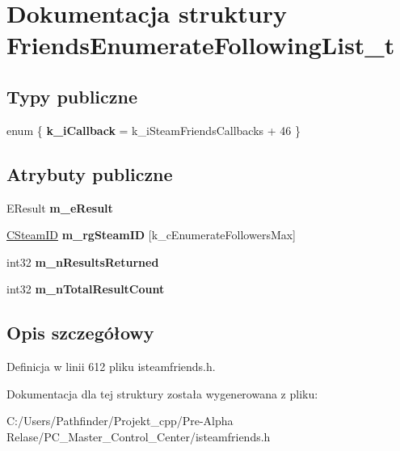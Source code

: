\hypertarget{struct_friends_enumerate_following_list__t}{}\section{Dokumentacja struktury Friends\+Enumerate\+Following\+List\+\_\+t}
\label{struct_friends_enumerate_following_list__t}
\subsection*{Typy publiczne}
\begin{DoxyCompactItemize}
\item 
\mbox{\label{struct_friends_enumerate_following_list__t_aa8e8ebd960263b29a7f01c3632163212}} 
enum \{ {\bfseries k\+\_\+i\+Callback} = k\+\_\+i\+Steam\+Friends\+Callbacks + 46
 \}
\end{DoxyCompactItemize}
\subsection*{Atrybuty publiczne}
\begin{DoxyCompactItemize}
\item 
\mbox{\label{struct_friends_enumerate_following_list__t_a529957e33bb31fd508ce5fd3ed955e9a}} 
E\+Result {\bfseries m\+\_\+e\+Result}
\item 
\mbox{\label{struct_friends_enumerate_following_list__t_af69b5b6d149ef4c71562ba5c3c5004a8}} 
\hyperlink{class_c_steam_i_d}{C\+Steam\+ID} {\bfseries m\+\_\+rg\+Steam\+ID} \mbox{[}k\+\_\+c\+Enumerate\+Followers\+Max\mbox{]}
\item 
\mbox{\label{struct_friends_enumerate_following_list__t_a4f0a8f33bfa75a6e361b36a2d49a660f}} 
int32 {\bfseries m\+\_\+n\+Results\+Returned}
\item 
\mbox{\label{struct_friends_enumerate_following_list__t_a41b7d6f82db0f3529670bed5a50e4b80}} 
int32 {\bfseries m\+\_\+n\+Total\+Result\+Count}
\end{DoxyCompactItemize}


\subsection{Opis szczegółowy}


Definicja w linii 612 pliku isteamfriends.\+h.



Dokumentacja dla tej struktury została wygenerowana z pliku\+:\begin{DoxyCompactItemize}
\item 
C\+:/\+Users/\+Pathfinder/\+Projekt\+\_\+cpp/\+Pre-\/\+Alpha Relase/\+P\+C\+\_\+\+Master\+\_\+\+Control\+\_\+\+Center/isteamfriends.\+h\end{DoxyCompactItemize}
